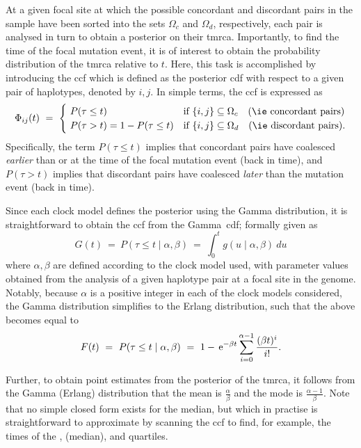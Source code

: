 
At a given focal site at which the possible concordant and discordant pairs in the sample have been sorted into the sets $\Omega_c$ and $\Omega_d$, respectively, each pair is analysed in turn to obtain a posterior on their \gls{tmrca}.
Importantly, to find the time of the focal mutation event, it is of interest to obtain the probability distribution of the \gls{tmrca} relative to $t$.
Here, this task is accomplished by introducing the \gls{ccf} which is defined as the posterior \gls{cdf} with respect to a given pair of haplotypes, denoted by ${i,j}$.
In simple terms, the \gls{ccf} is expressed as
\begin{equation}\label{eq:cumcoalfunc}
	\Phi_{ij}(t)~=~
	\begin{cases}
    ~ P(\tau \leq t)                  & \text{if}~{\{i,j\} \subseteq \Omega_c}\quad\text{(\ie concordant pairs)} \\
    ~ P(\tau >    t)=1-P(\tau \leq t) & \text{if}~{\{i,j\} \subseteq \Omega_d}\quad\text{(\ie discordant pairs)}\text{.}
  \end{cases}
\end{equation}
Specifically, the term ${P(\tau \leq t)}$ implies that concordant pairs have coalesced \emph{earlier} than or at the time of the focal mutation event (back in time), and ${P(\tau >t)}$ implies that discordant pairs have coalesced \emph{later} than the mutation event (back in time).

Since each clock model defines the posterior using the Gamma distribution, it is straightforward to obtain the \gls{ccf} from the Gamma~\gls{cdf}; formally given as
\begin{equation}
	G(t)~=~P(\tau \leq t \mid\alpha,\beta)~=~\int_{0}^{t}g(u\mid\alpha,\beta)~du
\end{equation}
where $\alpha,\beta$ are defined according to the clock model used, with parameter values obtained from the analysis of a given haplotype pair at a focal site in the genome.
Notably, because $\alpha$ is a positive integer in each of the clock models considered, the Gamma distribution simplifies to the Erlang distribution, such that the above becomes equal to \citep{papoulis2002probability}
\begin{equation}
	F(t)~=~P(\tau \leq t \mid\alpha,\beta)~=~1-\,\mathrm{e}^{-\beta t}\sum_{i=0}^{\alpha-1}\frac{(\beta t)^i}{i!}\text{.}
\end{equation}

Further, to obtain point estimates from the posterior of the \gls{tmrca},
it follows from the Gamma (Erlang) distribution that the mean is $\frac{\alpha}{\beta}$ and the mode is $\frac{\alpha-1}{\beta}$.
Note that no simple closed form exists for the median, but which in practise is straightforward to approximate by scanning the \gls{ccf} to find, for example, the times of the ,  (\ie median), and  quartiles.


